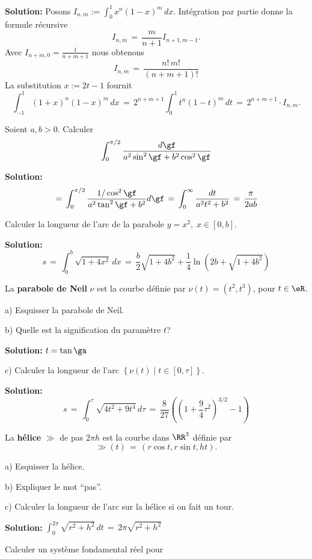 {\bf Solution:}
Posons $I_{n,m} := \int_0^1 x^n (1-x)^m \,dx$.
Intégration par partie donne
la formule récursive
$$
I_{n,m} \,=\, \frac {m}{n+1} I_{n+1,m-1}.
$$
Avec $I_{n+m,0} = \frac{1}{n+m+1}$ nous obtenons
$$
I_{n,m} \,=\, \frac{n!\,m!}{(n+m+1)!}
$$
La substitution $x := 2t-1$ fournit
$$
\int_{-1}^1 (1+x)^n (1-x)^m \,dx
\,=\, 2^{n+m+1} \int_0^1 t^n (1-t)^m \,dt \,=\,  2^{n+m+1} 
\cdot I_{n,m}. 
$$




\exerNico 
Soient $a,b >0$. 
Calculer
$$
\int_0^{\pi /2} \displaystyle \frac{d \gf}{a^2 \sin^2 \gf + b^2 \cos^2 \gf}
$$

{\bf Solution:}
$$
\,=\, \int_0^{\pi /2} \frac{1 / \cos^2 \gf}{a^2 \tan^2 \gf+b^2} d\gf \,=\, \int_0^\infty \frac {dt}{a^2t^2 + b^2} \,=\, \frac{\pi}{2ab}  
$$


\exerNico  
Calculer la longueur de l'arc de la parabole $y = x^2,\;x \in [0,b]$.

\medskip
{\bf Solution:}
$$
s \,=\, \int_0^b \sqrt{1+4x^2} \,dx \,=\, \frac b 2 \sqrt{1+4b^2}+ \frac 14 \ln \left(2b+ \sqrt{1+4b^2} \right)
$$


\exerNico  
La {\bf parabole de Neil} $\nu$ est la courbe définie par $\nu (t) = (t^2,t^3)$, pour  $t \in \eR$.

\medskip
a)
Esquisser la parabole de Neil.

\medskip
b)
Quelle est la signification du paramètre $t$?

\medskip
{\bf Solution:} $t = \tan \ga$

\medskip
c)
Calculer la longueur de l'arc 
$\left\{ \nu (t) \mid t \in [0,\tau] \right\}$.


\medskip
{\bf Solution:}
$$
s \,=\, \int_0^\tau \sqrt{4 t^2+9t^4} \,d\tau \,=\, \frac{8}{27} \left( \left(1+ \frac 94 \tau^2\right)^{3/2}-1 \right)
$$



\exerNico  
La {\bf hélice} $\gg$ de pas $2 \pi h$ est la courbe dans $\RR^3$ définie par
$$
\gg (t) \,=\, \left( r \cos t , r \sin t , h t \right)  .
$$


\medskip
a)
Esquisser la hélice.

\medskip
b)
Expliquer le mot ``pas''.


\medskip
c)
Calculer la longueur de l'arc sur la hélice si on fait un tour.

\medskip
{\bf Solution:} 
$\int_0^{2\pi} \sqrt{r^2+h^2} \,dt \,=\, 2 \pi \sqrt{r^2+h^2}$


\bigskip
\exerNico 
Calculer un système fondamental réel pour

